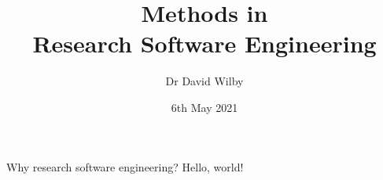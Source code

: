 \documentclass{beamer} %
\title{Methods in \\ Research Software Engineering}
\date{6th May 2021}
\author{Dr David Wilby}
\institute{Research Software Engineering Team,\\ The University of Sheffield}
\begin{document}
  \maketitle %

  \begin{frame}{Why research software engineering?}
    Hello, world!
  \end{frame}
\end{document}
